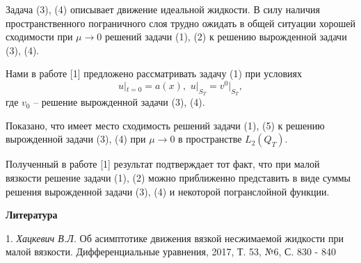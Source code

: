 Задача (3), (4) описывает движение идеальной жидкости.
В силу наличия пространственного пограничного слоя трудно ожидать в общей ситуации хорошей сходимости при $\mu\rightarrow 0$  решений задачи (1), (2) к решению вырожденной задачи (3), (4).

Нами в работе [1] предложено рассматривать задачу (1) при условиях
\begin{equation}
u|_{t=0} = a(x),\,\,u|_{S_T}= v^0|_{S_T},
\end{equation}
где $v_0$ -- решение вырожденной задачи (3), (4).

Показано, что имеет место сходимость решений задачи (1), (5) к решению вырожденной задачи (3), (4) при $\mu\rightarrow 0$ в пространстве $L_2(Q_T)$.

Полученный в работе [1] результат подтверждает тот факт, что при малой вязкости решение задачи (1), (2) можно приближенно представить в виде суммы решения вырожденной задачи (3), (4) и некоторой погранслойной функции.

\smallskip \centerline{\bf Литература}\nopagebreak

1. {\it Хацкевич В.Л.} Об асимптотике движения вязкой несжимаемой жидкости 	при малой вязкости. Дифференциальные уравнения, 2017, Т. 53, №6, С. 830 - 840

